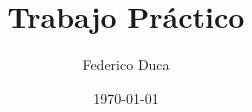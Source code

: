 \documentclass[
    a4paper,
    12pt,
    oneside  %
]{book}
\title{Trabajo Práctico}
\author{Federico Duca}
\date{\today}
\begin{document}
\maketitle

\begingroup
\pagestyle{empty}
\cleardoublepage
\endgroup

\begin{preliminary}
    
    
    \listoftables
    \listoffigures
    \tableofcontents
\end{preliminary}








\nocite{*}


\appendix

\end{document}
